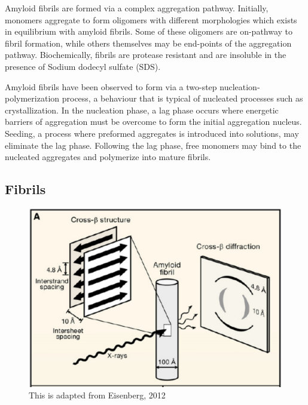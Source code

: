 Amyloid fibrils are formed via a complex aggregation pathway. Initially, monomers aggregate to form oligomers with different morphologies which exists in equilibrium with amyloid fibrils. Some of these oligomers are on-pathway to fibril formation, while others themselves may be end-points of the aggregation pathway. Biochemically, fibrils are protease resistant and are insoluble in the presence of Sodium dodecyl sulfate (SDS).


Amyloid fibrils have been observed to form via a two-step nucleation-polymerization process, a behaviour that is typical of nucleated processes such as crystallization.  In the nucleation phase, a lag phase occurs where energetic barriers of aggregation must be overcome to form the initial aggregation nucleus. Seeding, a process where preformed aggregates is introduced into solutions, may eliminate the lag phase.  Following the lag phase, free monomers may bind to the nucleated aggregates and polymerize into mature fibrils.\cite{Murphy:2002fe} 


\subsection{Fibrils}

\begin{figure}
  \centering
  \includegraphics[width=6in]{figures/introduction/fibril_structure_diffraction.pdf}
  \caption[Characteristic cross-$\beta$ spacings from X-ray fibre diffraction studies of amyloid fibrils]{This is adapted from Eisenberg, 2012}
  \label{fig:fibril_diffraction}
\end{figure}

